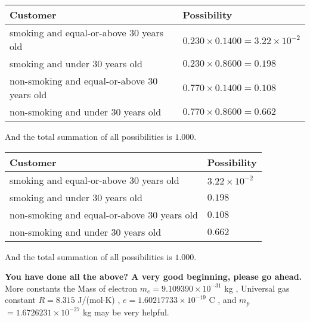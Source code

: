 \documentclass[12pt]{article}
\begin{document}
\noindent
\begin{tabular}{|l|l|}
\hline
Customer & Possibility \\
\hline
smoking  and  %
equal-or-above 30 years old  &
  $ %
0.230 \times  %
0.1400 =  %
3.22 \times 10^{-2}$ \\
\hline
smoking  and  %
under 30 years old &
  $ %
0.230 \times  %
0.8600 =  %
0.198$ \\
\hline
 non-smoking and  %
equal-or-above 30 years old  &
  $ %
0.770 \times  %
0.1400 =  %
0.108$ \\
\hline
 non-smoking and  %
under 30 years old &
  $ %
0.770 \times  %
0.8600 =  %
0.662$ \\
\hline
\end{tabular}
 
\noindent
And the total summation of all possibilities is $  %
1.000 $.
 
 
 
 
 
 
\noindent{}

 
\noindent
\begin{tabular}{|l|l|}
\hline
Customer & Possibility \\
\hline
smoking  and  %
equal-or-above 30 years old &
  $ %
3.22 \times 10^{-2}$ \\
\hline
smoking  and  %
under 30 years old &
  $ %
0.198$ \\
\hline
 non-smoking and  %
equal-or-above 30 years old &
  $ %
0.108$ \\
\hline
 non-smoking and  %
under 30 years old &
  $ %
0.662$ \\
\hline
\end{tabular}
 
\noindent
 And the total summation of all possibilities is $  %
1.000 $.
 
 
 
   
   
\vspace{0.3in}
{\textbf{\LARGE{You have done all the above? A very good beginning, please go ahead.}}}
More constants the
Mass of electron
$m_e$$ =
9.109390 \times 10^{-31} $
kg
,
Universal gas constant
$R$$ =
8.315 $
J/(mol$\cdot $K)
,
$e$$ =
1.60217733 \times 10^{-19} $
C
, and
$m_p$$ =
1.6726231 \times 10^{-27} $
kg
%
may be very helpful.
\vspace{0.3in}
   
   
  
\vspace{0.2in}
  
\end{document}
